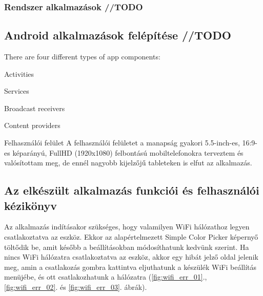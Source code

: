 \documentclass[../main.tex]{subfiles}
\begin{document}
            
        \subsubsection{Rendszer alkalmazások //TODO}
            
        
    \subsection{Android alkalmazások felépítése //TODO} %
        There are four different types of app components:

            Activities
            
            Services
            
            Broadcast receivers
            
            Content providers

        
    
        
        Felhasználói felület
        A felhasználói felületet a manapság gyakori 5.5-inch-es, 16:9-es képarányú, FullHD (1920x1080) felbontású mobiltelefonokra terveztem és valósítottam meg, de ennél nagyobb kijelzőjű tableteken is elfut az alkalmazás.
        
        
    \subsection{Az elkészült alkalmazás funkciói és felhasználói kézikönyv}
        Az alkalmazás indításakor szükséges, hogy valamilyen WiFi hálózathoz legyen csatlakoztatva az eszköz. Ekkor az
        alapértelmezett Simple Color Picker képernyő töltődik be, amit később a beállításokban módosíthatunk kedvünk szerint. Ha nincs WiFi hálózatra csatlakoztatva az eszköz, akkor egy hibát jelző oldal jelenik meg, amin a csatlakozás gombra kattintva eljuthatunk a készülék WiFi beállítás menüjébe, és ott csatlakozhatunk a hálózatra (\ref{fig:wifi_err_01}., \ref{fig:wifi_err_02}. és \ref{fig:wifi_err_03}. ábrák).
        
             
\end{document}
